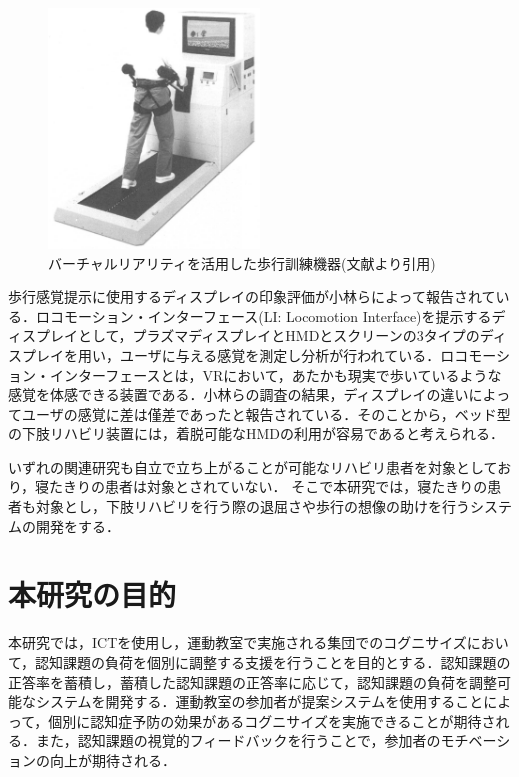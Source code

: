 \begin{figure}[tbp]
	\centering
			\includegraphics[width=0.5\textwidth]{chap1-figure/VRhokou.eps}
	\caption{バーチャルリアリティを活用した歩行訓練機器(文献\cite{日立}より引用)}
	\label{fig:hitachi}
\end{figure}

歩行感覚提示に使用するディスプレイの印象評価\cite{ディスプレイの違い}が小林らによって報告されている．ロコモーション・インターフェース\cite{ロコモーション}(LI: Locomotion Interface)を提示するディスプレイとして，プラズマディスプレイとHMDとスクリーンの3タイプのディスプレイを用い，ユーザに与える感覚を測定し分析が行われている．ロコモーション・インターフェースとは，VRにおいて，あたかも現実で歩いているような感覚を体感できる装置である．小林らの調査の結果，ディスプレイの違いによってユーザの感覚に差は僅差であったと報告されている．そのことから，ベッド型の下肢リハビリ装置には，着脱可能なHMDの利用が容易であると考えられる．

いずれの関連研究も自立で立ち上がることが可能なリハビリ患者を対象としており，寝たきりの患者は対象とされていない．
そこで本研究では，寝たきりの患者も対象とし，下肢リハビリを行う際の退屈さや歩行の想像の助けを行うシステムの開発をする．
\fi

\section{本研究の目的}
本研究では，ICTを使用し，運動教室で実施される集団でのコグニサイズにおいて，認知課題の負荷を個別に調整する支援を行うことを目的とする．認知課題の正答率を蓄積し，蓄積した認知課題の正答率に応じて，認知課題の負荷を調整可能なシステムを開発する．運動教室の参加者が提案システムを使用することによって，個別に認知症予防の効果があるコグニサイズを実施できることが期待される．また，認知課題の視覚的フィードバックを行うことで，参加者のモチベーションの向上が期待される．

